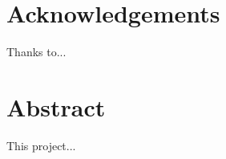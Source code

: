 \documentclass[a4paper,12pt,bibtotoc,notitlepage,oneside]{book}
\numberwithin{equation}{section}  %
\numberwithin{figure}{chapter}    %
\begin{document}
%



\chapter{Acknowledgements}
Thanks to...



\chapter{Abstract}
{This project...}

\mainmatter

\linespread{1.3} %










\backmatter
\end{document}
